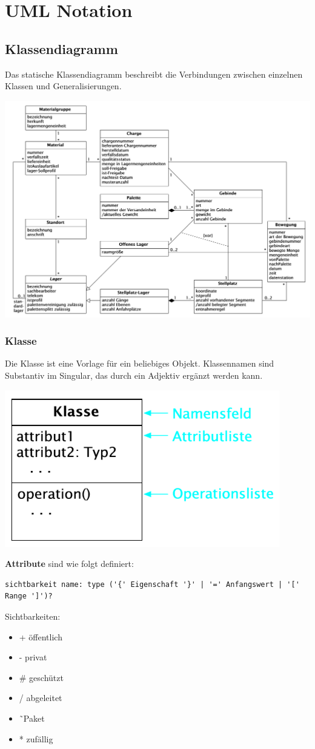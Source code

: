 \section{UML Notation}
\subsection{Klassendiagramm}
Das statische Klassendiagramm beschreibt die Verbindungen zwischen einzelnen Klassen und Generalisierungen.
\begin{center}
	\includegraphics[width=\columnwidth]{Images/klassendiagramm}
\end{center}

\subsubsection{Klasse}
Die Klasse ist eine Vorlage für ein beliebiges Objekt. Klassennamen sind Substantiv im Singular, das durch ein Adjektiv ergänzt werden kann.
\begin{center}
	\includegraphics[width=0.4\columnwidth]{Images/class}
\end{center}
\textbf{Attribute} sind wie folgt definiert:
\begin{lstlisting}
sichtbarkeit name: type ('{' Eigenschaft '}' | '=' Anfangswert | '[' Range ']')?
\end{lstlisting}Sichtbarkeiten:
\begin{itemize}[nosep]
	\item + öffentlich
	\item - privat
	\item \# geschützt
	\item / abgeleitet
	\item \~\ Paket
	\item * zufällig
\end{itemize}~\\

